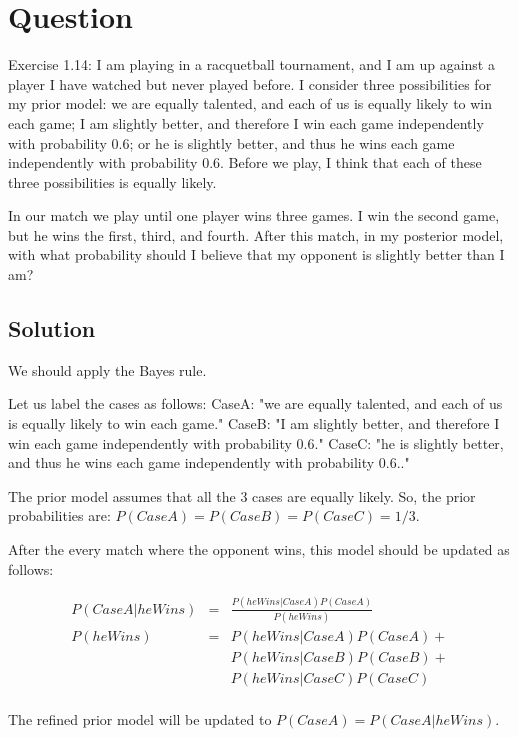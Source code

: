 \documentclass[10pt]{article}
\begin{document}
\section{Question}

Exercise 1.14: I am playing in a racquetball tournament, and I am up against a player I have watched but never played before. I consider three possibilities for my prior model: we are equally talented, and each of us is equally likely to win each game; I am slightly better, and therefore I win each game independently with probability 0.6; or he is slightly better, and thus he wins each game independently with probability 0.6. Before we play, I think that each of these three possibilities is equally likely.

In our match we play until one player wins three games. I win the second game, but he wins the first, third, and fourth. After this match, in my posterior model, with what probability should I believe that my opponent is slightly better than I am?

\subsection{Solution}

We should apply the Bayes rule.

Let us label the cases as follows: CaseA: "we are equally talented, and each of us is equally likely to win each game." CaseB: "I am slightly better, and therefore I win each game independently with probability 0.6." CaseC: "he is slightly better, and thus he wins each game independently with probability 0.6.."

The prior model assumes that all the 3 cases are equally likely. So, the prior probabilities are: $P(CaseA)=P(CaseB)=P(CaseC)=1/3$.

After the every match where the opponent wins, this model should be updated as follows:

\begin{eqnarray}
P(CaseA|heWins) & = & \frac{P(heWins|CaseA)P(CaseA)}{P(heWins)}\\
P(heWins) &= &P(heWins|CaseA)P(CaseA)+\\
&&P(heWins|CaseB)P(CaseB)+\\
&&P(heWins|CaseC)P(CaseC)\\
\end{eqnarray}

The refined prior model will be updated to $P(CaseA) = P(CaseA|heWins)$.
\end{document}
